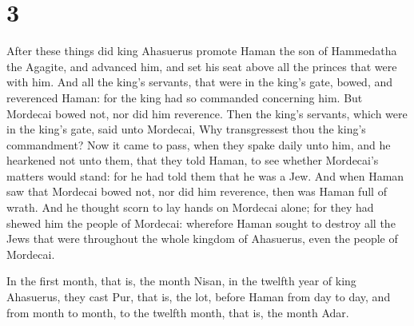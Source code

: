 \hypertarget{section-2}{%
\section{3}\label{section-2}}

 After these things did king Ahasuerus promote Haman the son
of Hammedatha the Agagite, and advanced him, and set his seat above all
the princes that were with him.  And all the king's
servants, that were in the king's gate, bowed, and reverenced Haman: for
the king had so commanded concerning him. But Mordecai bowed not, nor
did him reverence.  Then the king's servants, which were in
the king's gate, said unto Mordecai, Why transgressest thou the king's
commandment?  Now it came to pass, when they spake daily
unto him, and he hearkened not unto them, that they told Haman, to see
whether Mordecai's matters would stand: for he had told them that he was
a Jew.  And when Haman saw that Mordecai bowed not, nor did
him reverence, then was Haman full of wrath.  And he thought
scorn to lay hands on Mordecai alone; for they had shewed him the people
of Mordecai: wherefore Haman sought to destroy all the Jews that were
throughout the whole kingdom of Ahasuerus, even the people of Mordecai.

 In the first month, that is, the month Nisan, in the
twelfth year of king Ahasuerus, they cast Pur, that is, the lot, before
Haman from day to day, and from month to month, to the twelfth month,
that is, the month Adar.

